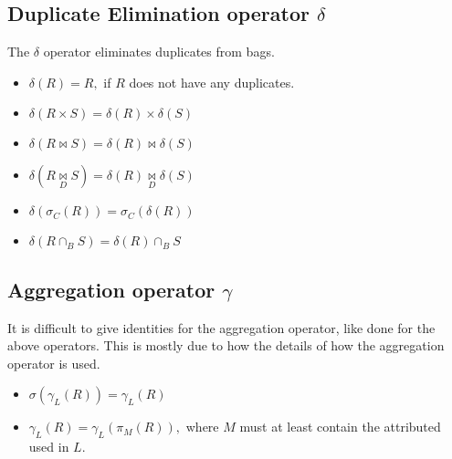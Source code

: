 \subsection{Duplicate Elimination operator $\delta$}
The $\delta$ operator eliminates duplicates from bags. 
\begin{itemize}
    \item $\delta(R)= R,$ if $R$ does not have any duplicates.
    \item $\delta(R \times S) = \delta(R) \times \delta(S)$
    \item $\delta(R \bowtie S) = \delta(R) \bowtie \delta(S)$
    \item $\delta(R \underset{D}{\bowtie} S) = \delta(R) \underset{D}{\bowtie} \delta(S)$
    \item $\delta(\sigma_{C}(R)) = \sigma_{C}(\delta(R))$
    \item $\delta(R \cap_{B} S) = \delta(R) \cap_{B} S$
\end{itemize}

\subsection{Aggregation operator $\gamma$}
It is difficult to give identities for the aggregation operator, like done for the above operators. This is mostly due to how the details of how the aggregation operator is used.
\begin{itemize}
    \item $\sigma(\gamma_{L}(R)) = \gamma_{L}(R)$
    \item $\gamma_{L}(R) = \gamma_{L}(\pi_{M}(R)),$ where $M$ must at least contain the attributed used in $L$.
\end{itemize}


